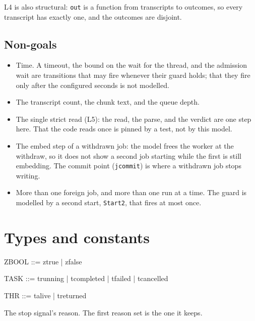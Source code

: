 \documentclass[a4paper,10pt,fleqn]{article}
\newcommand{\field}[1]{\texttt{#1}}
\begin{document}
L4 is also structural: \field{out} is a function from transcripts to outcomes,
so every transcript has exactly one, and the outcomes are disjoint.

\subsection{Non-goals}

\begin{itemize}
  \item Time. A timeout, the bound on the wait for the thread, and the
    admission wait are transitions that may fire whenever their guard holds;
    that they fire only after the configured seconds is not modelled.
  \item The transcript count, the chunk text, and the queue depth.
  \item The single strict read (L5): the read, the parse, and the verdict are
    one step here. That the code reads once is pinned by a test, not by this
    model.
  \item The embed step of a withdrawn job: the model frees the worker at the
    withdraw, so it does not show a second job starting while the first is
    still embedding. The commit point (\field{jcommit}) is where a withdrawn job
    stops writing.
  \item More than one foreign job, and more than one run at a time. The guard is
    modelled by a second start, \field{Start2}, that fires at most once.
\end{itemize}

\section{Types and constants}
\label{sec:types}

\begin{zed}
ZBOOL ::= ztrue | zfalse
\end{zed}

\begin{zed}
TASK ::= trunning | tcompleted | tfailed | tcancelled
\end{zed}

\begin{zed}
THR ::= talive | treturned
\end{zed}

The stop signal's reason. The first reason set is the one it keeps.
\end{document}
